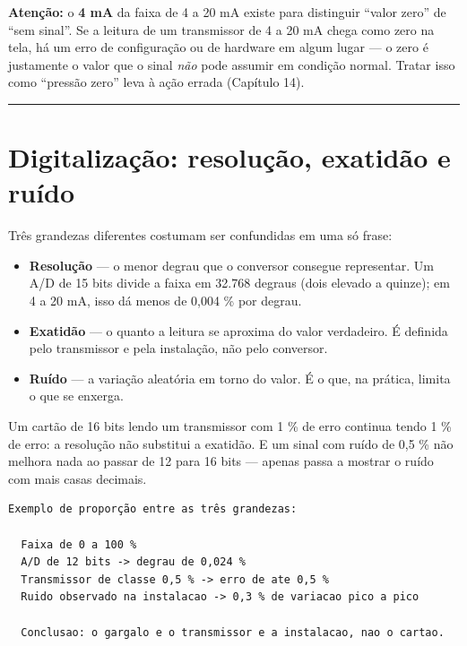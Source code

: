 \begin{caixaatencao}

\textbf{Atenção:} o \textbf{4 mA} da faixa de 4 a 20 mA existe para distinguir ``valor zero'' de ``sem
sinal''. Se a leitura de um transmissor de 4 a 20 mA chega como zero na tela, há um erro de
configuração ou de hardware em algum lugar --- o zero é justamente o valor que o sinal \emph{não} pode
assumir em condição normal. Tratar isso como ``pressão zero'' leva à ação errada (Capítulo 14).

\end{caixaatencao}

\begin{center}\rule{0.5\linewidth}{0.5pt}\end{center}

\section{Digitalização: resolução, exatidão e ruído}\label{digitalizauxe7uxe3o-resoluuxe7uxe3o-exatiduxe3o-e-ruuxeddo}

Três grandezas diferentes costumam ser confundidas em uma só frase:

\begin{itemize}
\tightlist
\item
  \textbf{Resolução} --- o menor degrau que o conversor consegue representar. Um A/D de 15 bits divide a
  faixa em 32.768 degraus (dois elevado a quinze); em 4 a 20 mA, isso dá menos de 0,004 \% por degrau.
\item
  \textbf{Exatidão} --- o quanto a leitura se aproxima do valor verdadeiro. É definida pelo transmissor e
  pela instalação, não pelo conversor.
\item
  \textbf{Ruído} --- a variação aleatória em torno do valor. É o que, na prática, limita o que se enxerga.
\end{itemize}

Um cartão de 16 bits lendo um transmissor com 1 \% de erro continua tendo 1 \% de erro: a resolução
não substitui a exatidão. E um sinal com ruído de 0,5 \% não melhora nada ao passar de 12 para 16
bits --- apenas passa a mostrar o ruído com mais casas decimais.

\begin{lstlisting}
Exemplo de proporção entre as três grandezas:

  Faixa de 0 a 100 %
  A/D de 12 bits -> degrau de 0,024 %
  Transmissor de classe 0,5 % -> erro de ate 0,5 %
  Ruido observado na instalacao -> 0,3 % de variacao pico a pico

  Conclusao: o gargalo e o transmissor e a instalacao, nao o cartao.
\end{lstlisting}

